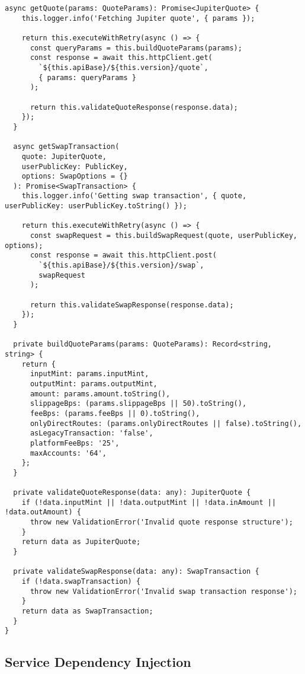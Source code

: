 \documentclass[11pt,a4paper]{article}
\begin{document}
\begin{lstlisting}[style=typescript, caption=Service Layer Architecture]
  async getQuote(params: QuoteParams): Promise<JupiterQuote> {
    this.logger.info('Fetching Jupiter quote', { params });
    
    return this.executeWithRetry(async () => {
      const queryParams = this.buildQuoteParams(params);
      const response = await this.httpClient.get(
        `${this.apiBase}/${this.version}/quote`,
        { params: queryParams }
      );
      
      return this.validateQuoteResponse(response.data);
    });
  }
  
  async getSwapTransaction(
    quote: JupiterQuote,
    userPublicKey: PublicKey,
    options: SwapOptions = {}
  ): Promise<SwapTransaction> {
    this.logger.info('Getting swap transaction', { quote, userPublicKey: userPublicKey.toString() });
    
    return this.executeWithRetry(async () => {
      const swapRequest = this.buildSwapRequest(quote, userPublicKey, options);
      const response = await this.httpClient.post(
        `${this.apiBase}/${this.version}/swap`,
        swapRequest
      );
      
      return this.validateSwapResponse(response.data);
    });
  }
  
  private buildQuoteParams(params: QuoteParams): Record<string, string> {
    return {
      inputMint: params.inputMint,
      outputMint: params.outputMint,
      amount: params.amount.toString(),
      slippageBps: (params.slippageBps || 50).toString(),
      feeBps: (params.feeBps || 0).toString(),
      onlyDirectRoutes: (params.onlyDirectRoutes || false).toString(),
      asLegacyTransaction: 'false',
      platformFeeBps: '25',
      maxAccounts: '64',
    };
  }
  
  private validateQuoteResponse(data: any): JupiterQuote {
    if (!data.inputMint || !data.outputMint || !data.inAmount || !data.outAmount) {
      throw new ValidationError('Invalid quote response structure');
    }
    return data as JupiterQuote;
  }
  
  private validateSwapResponse(data: any): SwapTransaction {
    if (!data.swapTransaction) {
      throw new ValidationError('Invalid swap transaction response');
    }
    return data as SwapTransaction;
  }
}
\end{lstlisting}

\subsection{Service Dependency Injection}
\end{document}
